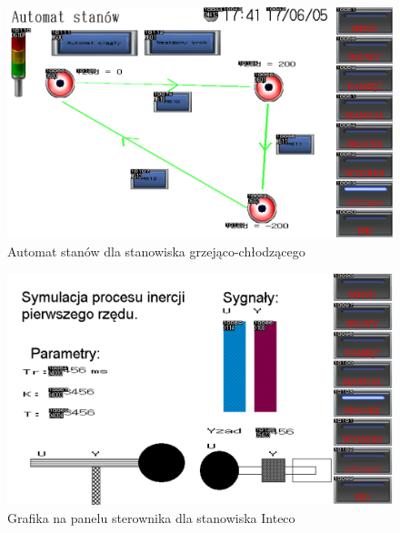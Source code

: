 \documentclass[a4paper,titlepage,11pt,twosides,floatssmall]{mwrep}
\begin{document}
\begin{figure}[]
	\centering
	\includegraphics[scale=0.6]{../intecographics.pdf}
	\caption{Automat stanów dla stanowiska grzejąco-chłodzącego}
	\label{zad12_graph}
\end{figure}


\begin{figure}[]
	\centering
	\includegraphics[scale=0.6]{../intecographics2.pdf}
	\caption{Grafika na panelu sterownika dla stanowiska Inteco}
	\label{zad13_graph}
\end{figure}

\end{document}
